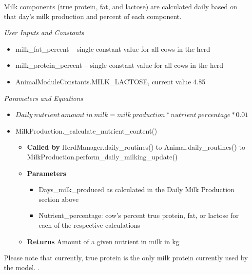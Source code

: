 \begin{refsection}
\begin{enumerate}
        Milk components (true protein, fat, and lactose) are calculated daily based on that day’s milk production and percent of each component. 
        \vspace{0.1cm}
        
         \textit{User Inputs and Constants}
         \vspace{0.1cm}

         \begin{itemize}
             \item milk\_fat\_percent – single constant value for all cows in the herd 
             \item milk\_protein\_percent – single constant value for all cows in the herd 
             \item AnimalModuleConstants.MILK\_LACTOSE, current value 4.85

         \end{itemize}

         \textit{Parameters and Equations}
         \vspace{0.1cm}

        \begin{itemize}
            \item \(Daily\ nutrient\ amount\ in\ milk = milk\ production * nutrient\ percentage * 0.01\)
            \item MilkProduction.\_calculate\_nutrient\_content()
            \begin{itemize}
                \item \textbf{Called by} HerdManager.daily\_routines() to Animal.daily\_routines() to MilkProduction.perform\_daily\_milking\_update()
                \item \textbf{Parameters} 
                \begin{itemize}
                    \item Days\_milk\_produced as calculated in the Daily Milk Production section above
                    \item Nutrient\_percentage: cow’s percent true protein, fat, or lactose for each of the respective calculations
                \end{itemize}
                \item \textbf{Returns} Amount of a given nutrient in milk in kg
            \end{itemize}
        \end{itemize}
         
        \begin{tcolorbox}[colback=white, colframe=black, boxrule=0.5pt, arc=3pt, width=\textwidth]
            Please note that currently, true protein is the only milk protein currently used by the model. .
        \end{tcolorbox}


\end{enumerate}
\end{refsection}
